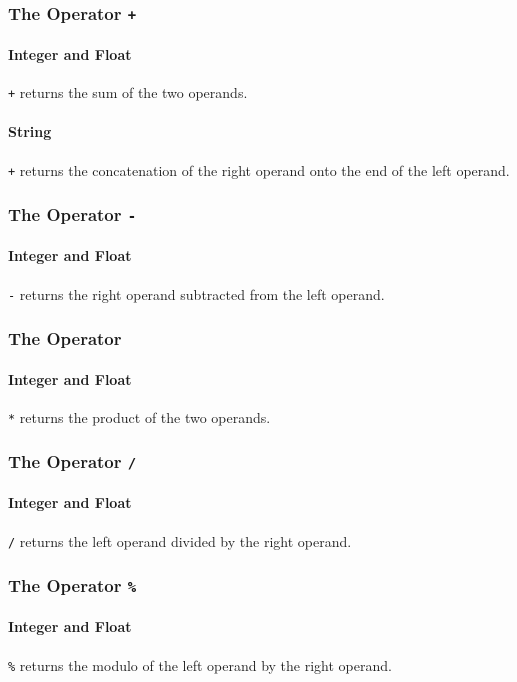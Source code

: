 \subsubsection{The Operator {\tt +}}
\paragraph{Integer and Float}
\verb!+! returns the sum of the two operands.
\paragraph{String}
\verb!+! returns the concatenation of the right operand onto the end of the left operand.

\subsubsection{The Operator {\tt -}}
\paragraph{Integer and Float}
\verb!-! returns the right operand subtracted from the left operand.

\subsubsection{The Operator {\tt *}}
\paragraph{Integer and Float}
\verb!*! returns the product of the two operands.

\subsubsection{The Operator {\tt /}}
\paragraph{Integer and Float}
\verb!/! returns the left operand divided by the right operand.

\subsubsection{The Operator {\tt \%}}
\paragraph{Integer and Float}
\verb!%! returns the modulo of the left operand by the right operand.

